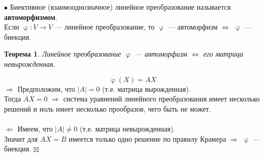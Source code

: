 \documentclass[a4paper, 12pt]{article}
\newtheorem*{theorem}{Теорема}
\newenvironment{Proof}
{\par\noindent{$\blacklozenge$}}
{\hfill$\scriptstyle\boxtimes$}
\renewcommand{\varphi}{\upvarphi}
\begin{document}
    $\bullet$ Биективное (взаимооднозначное) линейное преобразование называется \textbf{автоморфизмом}.\\
    Если $\varphi: V \rightarrow V$ --- линейное преобразование, то $\varphi$ --- автоморфизм $\Leftrightarrow$ $\varphi$ --- биекция.
    \begin{theorem}
        Линейное преобразование $\varphi$ --- автоморфизм $\Leftrightarrow$ его матрица невырожденная.
    \end{theorem}
    \begin{Proof}
    $$\varphi(X)=AX$$
    $\Rightarrow$ Предположим, что $|A| = 0$ (т.е. матрица вырожденная).\\
    Тогда $AX=0$ $\Rightarrow$ система уравнений линейного преобразования имеет несколько решений и ноль имеет несколько прообразов, чего быть не может.\\\\
    $\Leftarrow$ Имеем, что $|A| \neq 0$ (т.е. матрица невырожденная).\\
    Значит для $AX=B$ имеется только одно решение по правилу Крамера $\Rightarrow$ $\varphi$ --- биекция.
    \end{Proof}
\end{document}
